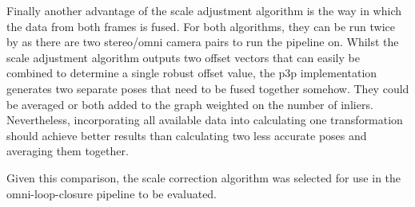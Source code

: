 
Finally another advantage of the scale adjustment algorithm is the way in which the data from both frames is fused.  For both algorithms, they can be run twice by as there are two stereo/omni camera pairs to run the pipeline on. Whilst the scale adjustment algorithm outputs two offset vectors that can easily be combined to determine a single robust offset value, the p3p implementation generates two separate poses that need to be fused together somehow.  They could be averaged or both added to the graph weighted on the number of inliers. Nevertheless, incorporating all available data into calculating one transformation should achieve better results than calculating two less accurate poses and averaging them together.

Given this comparison, the scale correction algorithm was selected for use in the omni-loop-closure pipeline to be evaluated.

\newpage

